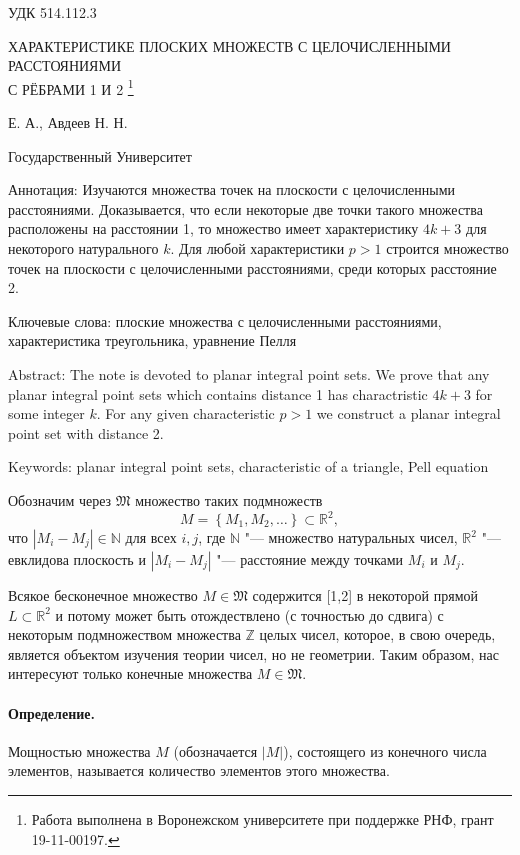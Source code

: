 \documentclass[a4paper,openbib]{article}
\begin{document}
\noindent УДК 514.112.3


\begin{center}
	 ХАРАКТЕРИСТИКЕ ПЛОСКИХ МНОЖЕСТВ С ЦЕЛОЧИСЛЕННЫМИ РАССТОЯНИЯМИ\\С РЁБРАМИ 1 И 2
	\footnote{
		Работа выполнена в Воронежском университете при поддержке РНФ, грант 19-11-00197.
	}

	 Е. А., Авдеев Н. Н.

	 Государственный Университет
\end{center}

Аннотация:
	Изучаются множества точек на плоскости с целочисленными расстояниями.
	Доказывается, что если некоторые две точки такого множества расположены на расстоянии 1,
	то множество имеет характеристику $4k+3$ для некоторого натурального $k$.
	Для любой характеристики $p>1$ строится множество точек на плоскости с целочисленными расстояниями,
	среди которых расстояние 2.

Ключевые слова:
	плоские множества с целочисленными расстояниями,
	характеристика треугольника,
	уравнение Пелля

Abstract:
	The note is devoted to planar integral point sets.
	We prove that any planar integral point sets which contains distance 1
	has charactristic $4k+3$ for some integer $k$.
	For any given characteristic $p>1$ we construct a planar integral point set
	with distance 2.

Keywords:
	planar integral point sets,
	characteristic of a triangle,
	Pell equation




Обозначим через $\mathfrak{M}$ множество таких подмножеств $$M=\left\{M_{1}, M_{2}, \ldots\right\} \subset \mathbb{R}^{2},$$
что $\left|M_{i}-M_{j}\right| \in \mathbb{N}$ для всех ${i},{j}$,
где $\mathbb{N}$ "--- множество натуральных чисел,
$\mathbb{R}^2$ "--- евклидова плоскость
и $\left|M_{i}-M_{j}\right|$ "--- расстояние между точками $M_{i}$ и $M_{j}$.




Всякое бесконечное множество $M \in \mathfrak{M}$ содержится [1,2] в некоторой прямой $L \subset \mathbb{R}^{2}$
и потому может быть отождествлено (с точностью до сдвига) с некоторым подмножеством множества $\mathbb{Z}$ целых чисел,
которое, в свою очередь, является объектом изучения теории чисел, но не геометрии.
Таким образом, нас интересуют только конечные множества $M \in \mathfrak{M}$.

\paragraph{Определение.}
Мощностью множества $M$ (обозначается $|M|$), состоящего из конечного
числа элементов, называется количество элементов этого множества.
\end{document}
